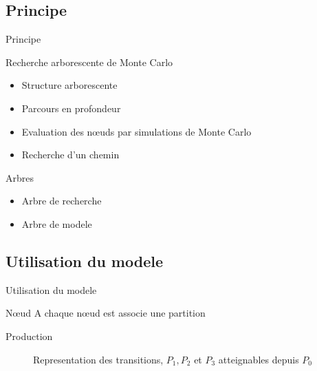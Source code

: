 \documentclass[tikz]{beamer}
\begin{document}
\subsection{Principe}
\begin{frame}[c]{Principe}
  \begin{block}{Recherche arborescente de Monte Carlo}
    \begin{itemize}
      \item Structure arborescente
      \item Parcours en profondeur
      \item Evaluation des n\oe{}uds par simulations de Monte Carlo
      \item Recherche d'un chemin
    \end{itemize}
  \end{block}
  \begin{block}{Arbres}
    \begin{itemize}
      \item Arbre de recherche
      \item Arbre de modele
    \end{itemize}
  \end{block}
\end{frame}

\subsection{Utilisation du modele}
\begin{frame}[c]{Utilisation du modele}
  \begin{block}{N\oe{}ud}
    A chaque n\oe{}ud est associe une partition
  \end{block}
  \begin{block}{Production}
    \begin{figure}
    \begin{center}
    \end{center}
    \caption{Representation des transitions, \(P_1, P_2\) et \(P_3\)
    atteignables depuis \(P_0\)}
    \label{fig:}
    \end{figure}

  \end{block}
\end{frame}
\end{document}
